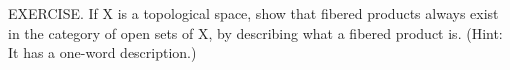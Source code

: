 EXERCISE. If X is a topological space, show that fibered products always exist in the category of open sets of X, by describing what a fibered product is. (Hint: It has a one-word description.)
